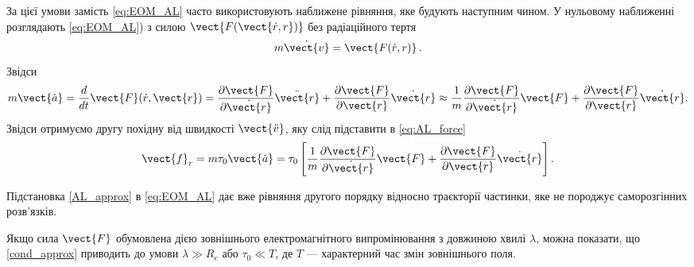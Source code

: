 За цієї умови замість \eqref{eq:EOM_AL} часто використовують наближене рівняння, яке будують наступним чином. У нульовому наближенні розглядають \eqref{eq:EOM_AL}) з силою $\vect{F(\vect{\dot{r}, r})}$ без радіаційного тертя
\begin{equation}
m\dot{\vect{v}} = \vect{F(\dot r, r)}\,.
\end{equation}
Звідси
\begin{equation*}
m{\vect{\dot a}} = \frac{d}{dt}\vect{F}(\dot{r}, \vect{r}) =
\frac{\partial\vect{F}}{\partial\dot{\vect{r}}}\ddot{\vect{r}}
+
\frac{\partial \vect{F} }{\partial \vect{r} }\dot{\vect{r}}
\approx
\frac{1}{m} \frac{\partial\vect{F}}{\partial \dot{\vect{r}}} \vect{F}
+ \frac{\partial \vect{F}}{\partial\vect{r}}\dot{\vect{r}}.
\end{equation*}
Звідси отримуємо другу похідну від швидкості $\vect{\ddot v}$, яку слід підставити в \eqref{eq:AL_force}
\begin{equation}\label{AL_approx}
\vect{f}_{r} = m\tau_0\vect{\dot a} =
\tau_0\left[
 \frac{1}{m} \frac{\partial \vect{F} }{\partial \dot{\vect{r}}} \vect{F} +\frac{\partial \vect{F}}{\partial \vect{r}}\dot{\vect{r}}
\right].
\end{equation}

 Підстановка \eqref{AL_approx} в \eqref{eq:EOM_AL} дає вже рівняння другого порядку відносно траєкторії частинки, яке не породжує
 саморозгінних розв'язків.

 Якщо сила $\vect{F}$ обумовлена дією зовнішнього  електромагнітного випромінювання з довжиною хвилі $\lambda$, можна показати, що  \eqref{cond_approx} приводить до умови $\lambda \gg R_e $ або $\tau_0 \ll T$, де $T$ --- характерний час змін зовнішнього поля.



%
%
%
%


